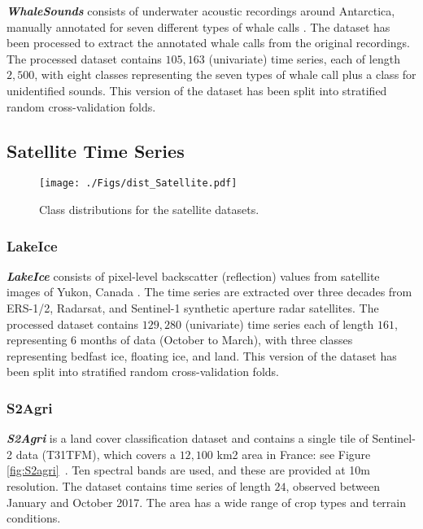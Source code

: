 \documentclass[twoside,11pt,preprint]{article}
\begin{document}
\textbf{\textit{WhaleSounds}} consists of underwater acoustic recordings around Antarctica, manually annotated for seven different types of whale calls \citep{data_whalesounds_2020,miller_etal_2021}. The dataset has been processed to extract the annotated whale calls from the original recordings. The processed dataset contains $105{,}163$ (univariate) time series, each of length $2{,}500$, with eight classes representing the seven types of whale call plus a class for unidentified sounds. This version of the dataset has been split into stratified random cross-validation folds.

\subsection{Satellite Time Series}

\begin{figure}[h]%
    \centering%
    \texttt{[image: ./Figs/dist\_Satellite.pdf]}%
    \caption{Class distributions for the satellite datasets.}%
    \label{fig-class-dist-satellite}
\end{figure}%

\subsubsection{LakeIce}

\textbf{\textit{LakeIce}} consists of pixel-level backscatter (reflection) values from satellite images of Yukon, Canada \citep{data_lakeice_2022,shaposhnikova_eal_2023}. The time series are extracted over three decades from ERS-1/2, Radarsat, and Sentinel-1 synthetic aperture radar satellites. The processed dataset contains $129{,}280$ (univariate) time series each of length $161$, representing 6 months of data (October to March), with three classes representing bedfast ice, floating ice, and land. This version of the dataset has been split into stratified random cross-validation folds.

\subsubsection{S2Agri}

\textbf{\textit{S2Agri}} is a land cover classification dataset and contains a single tile of Sentinel-2 data (T31TFM), which covers a $12{,}100$ km2 area in France: see Figure \ref{fig:S2agri}~\citep{garnot_etal_2020,data_s2agri_2022}. Ten spectral bands are used, and these are provided at 10m resolution. The dataset contains time series of length $24$, observed between January and October 2017. The area has a wide range of crop types and terrain conditions.
\end{document}
